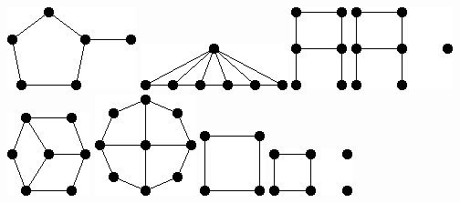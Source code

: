 \documentclass[11pt,paper=b5,footinclude,headinclude]{scrbook} %
\begin{document}
\includegraphics[scale=0.5,frame]{smallGraphs/g_5pan.png}     
\includegraphics[scale=0.5,frame]{smallGraphs/g_6fan.png}     
\includegraphics[scale=0.5,frame]{smallGraphs/g_A.png}     
\includegraphics[scale=0.5,frame]{smallGraphs/g_AUK1.png}     
\includegraphics[scale=0.5,frame]{smallGraphs/g_BW3.png}     
\includegraphics[scale=0.5,frame]{smallGraphs/g_BW4.png}     
\includegraphics[scale=0.5,frame]{smallGraphs/g_C4.png}     
\includegraphics[scale=0.5,frame]{smallGraphs/g_C4U2K1.png}     
\end{document}
